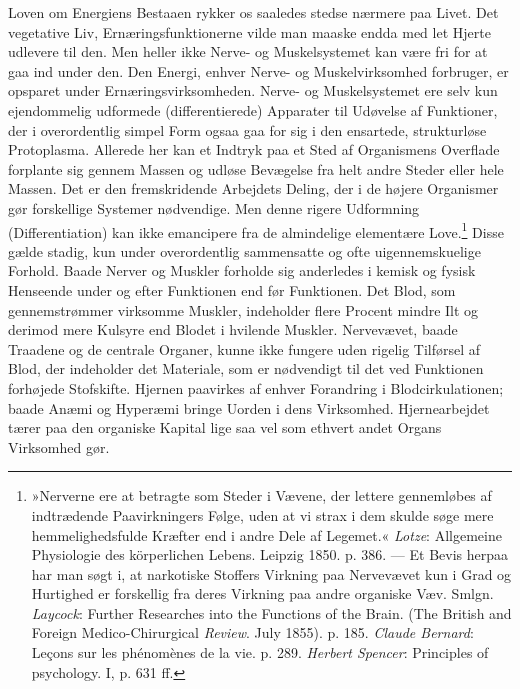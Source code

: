 \documentclass[12pt,a4paper,openany]{book}
\newcommand{\opage}[1]{\marginnote{\footnotesize\textit{[#1]}}}
\begin{document}
Loven om Energiens Bestaaen rykker os saaledes stedse nærmere paa Livet.
Det vegetative Liv, Ernæringsfunktionerne vilde man maaske endda med let
Hjerte udlevere til den. Men heller ikke Nerve- og Muskelsystemet kan
være fri for at gaa ind under den. Den Energi, enhver Nerve- og
Muskelvirksomhed forbruger, er opsparet under Ernæringsvirksomheden.
Nerve- og Muskelsystemet ere selv kun ejendommelig udformede
(differentierede) Apparater til Udøvelse af Funktioner, der i
overordentlig simpel Form ogsaa gaa for sig i den ensartede,
strukturløse Protoplasma. Allerede her kan et Indtryk paa et Sted af
Organismens Overflade forplante sig gennem Massen og udløse Bevægelse
fra helt andre Steder eller hele Massen. Det er den fremskridende
Arbejdets Deling, der i de højere Organismer gør forskellige Systemer
nødvendige. Men denne rigere Udformning (Differentiation) kan ikke
emancipere fra de almindelige elementære Love.\footnote[1]{»Nerverne ere
at betragte som Steder i Vævene, der lettere gennemløbes af indtrædende
Paavirkningers Følge, uden at vi strax i dem skulde søge mere
hemmelighedsfulde Kræfter end i andre Dele af Legemet.« \emph{Lotze}:
Allgemeine Physiologie des körperlichen Lebens. Leipzig 1850. p. 386.
--- Et Bevis herpaa har man søgt i, at narkotiske Stoffers Virkning paa
Nervevævet kun i Grad og Hurtighed er forskellig fra deres Virkning paa
andre organiske Væv. Smlgn. \emph{Laycock}: Further Researches into the
Functions of the Brain. (The British and Foreign Medico-Chirurgical
\emph{Review}. July 1855). p. 185. \emph{Claude Bernard}: Leçons sur les
phénomènes de la vie. p. 289. \emph{Herbert Spencer}: Principles of
psychology. I, p. 631 ff.} Disse gælde stadig, kun under overordentlig
sammensatte og ofte uigennemskuelige Forhold. Baade Nerver og Muskler
forholde sig anderledes i kemisk og fysisk Henseende under og efter
Funktionen end før Funktionen. Det Blod, som gennemstrømmer virksomme
Muskler, indeholder
\opage{44}flere Procent mindre Ilt og derimod mere Kulsyre end Blodet i
hvilende Muskler. Nervevævet, baade Traadene og de centrale Organer,
kunne ikke fungere uden rigelig Tilførsel af Blod, der indeholder det
Materiale, som er nødvendigt til det ved Funktionen forhøjede
Stofskifte. Hjernen paavirkes af enhver Forandring i Blodcirkulationen;
baade Anæmi og Hyperæmi bringe Uorden i dens Virksomhed. Hjernearbejdet
tærer paa den organiske Kapital lige saa vel som ethvert andet Organs
Virksomhed gør.
\end{document}
